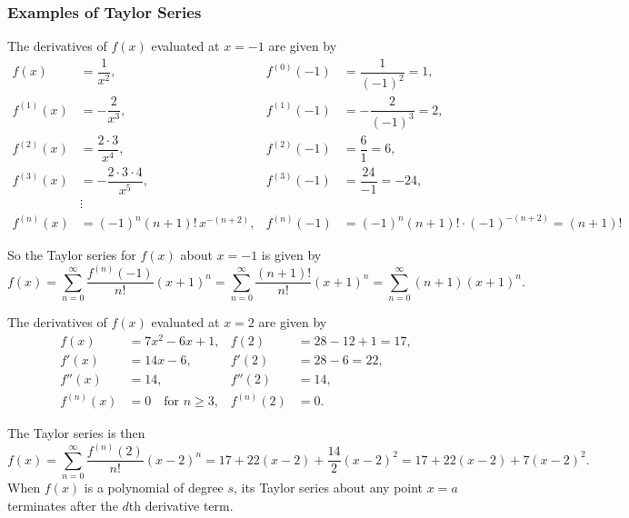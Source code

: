 \subsubsection{Examples of Taylor Series}

\begin{ex}[Taylor Series for $f(x) = \dfrac{1}{x^2}$ about $x = -1$.]

The derivatives of $f(x)$ evaluated at $x = -1$ are given by
\begin{align*}
    f(x) &= \dfrac{1}{x^2}, & f^{(0)}(-1) &= \dfrac{1}{(-1)^2} = 1, \\
    f^{(1)}(x) &= -\dfrac{2}{x^3}, & f^{(1)}(-1) &= -\dfrac{2}{(-1)^3} = 2, \\
    f^{(2)}(x) &= \dfrac{2 \cdot 3}{x^4}, & f^{(2)}(-1) &= \dfrac{6}{1} = 6, \\
    f^{(3)}(x) &= -\dfrac{2 \cdot 3 \cdot 4}{x^5}, & f^{(3)}(-1) &= \dfrac{24}{-1} = -24, \\
    &\vdots \\
    f^{(n)}(x) &= (-1)^n (n+1)! \, x^{-(n+2)}, & f^{(n)}(-1) &= (-1)^n (n+1)! \cdot (-1)^{-(n+2)} = (n+1)!
\end{align*}

So the Taylor series for $f(x)$ about $x = -1$ is given by
\[f(x) = \sum_{n=0}^{\infty} \dfrac{f^{(n)}(-1)}{n!}(x + 1)^n = \sum_{n=0}^{\infty} \dfrac{(n+1)!}{n!}(x + 1)^n = \sum_{n=0}^{\infty} (n+1)(x + 1)^n.\]
\end{ex}
\begin{ex}[Taylor Series for $f(x) = 7x^2 - 6x + 1$ about $x = 2$.]

The derivatives of $f(x)$ evaluated at $x = 2$ are given by
\begin{align*}
    f(x) &= 7x^2 - 6x + 1, & f(2) &= 28 - 12 + 1 = 17, \\
    f'(x) &= 14x - 6, & f'(2) &= 28 - 6 = 22, \\
    f''(x) &= 14, & f''(2) &= 14, \\
    f^{(n)}(x) &= 0 \quad \text{for } n \geq 3, & f^{(n)}(2) &= 0.
\end{align*}

The Taylor series is then
\[ f(x) = \sum_{n=0}^{\infty} \dfrac{f^{(n)}(2)}{n!} (x - 2)^n 
= 17 + 22(x - 2) + \dfrac{14}{2}(x - 2)^2 
= 17 + 22(x - 2) + 7(x - 2)^2.\]
When $f(x)$ is a polynomial of degree $s$, its Taylor series about any point $x=a$ terminates after the $d$th derivative term. 
\end{ex}


